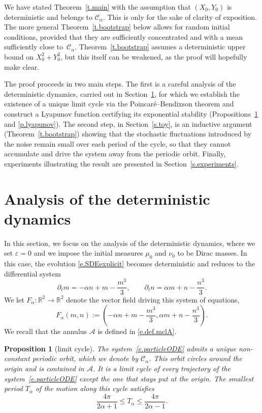\documentclass[11pt]{amsart}
\newtheorem{proposition}{Proposition}
\theoremstyle{remark}
\newtheorem{remark}[proposition]{Remark}
\theoremstyle{definition}
\numberwithin{equation}{section}
\numberwithin{proposition}{section}
\newcommand{\R}{\mathbb{R}}
\newcommand{\ep}{\varepsilon}
\renewcommand{\le}{\leqslant}
\newcommand{\Ll}{\left}
\newcommand{\Rr}{\right}
\newcommand{\dr}{\partial}
\newcommand{\1}{\mathbf{1}}
\newcommand{\mcl}{\mathcal}
\newcommand{\msc}{\mathscr}
\newcommand{\al}{\alpha}
\begin{document}
%
We have stated Theorem~\ref{t.main} with the assumption that $(X_0,Y_0)$ is deterministic and belongs to $\msc C_\al$. This is only for the sake of clarity of exposition. The more general Theorem~\ref{t.bootstrap} below allows for random initial conditions, provided that they are sufficiently concentrated and with a mean sufficiently close to~$\msc C_\al$. Theorem~\ref{t.bootstrap} assumes a deterministic upper bound on $X_0^2 + Y_0^2$, but this itself can be weakened, as the proof will hopefully make clear.
%

The proof proceeds in two main steps. The first is a careful analysis of the deterministic dynamics, carried out in Section~\ref{s.limitcycle}, for which we establish the existence of a unique limit cycle via the Poincaré–Bendixson theorem and construct a Lyapunov function certifying its exponential stability (Propositions~\ref{p.limitcycle} and \ref{p.lyapunov}). The second step, in Section~\ref{s.toy}, is an inductive argument (Theorem~\ref{t.bootstrap}) showing that the stochastic fluctuations introduced by the noise remain small over each period of the cycle, so that they cannot accumulate and drive the system away from the periodic orbit. Finally, experiments illustrating the result are presented in Section~\ref{s.experiments}.

\section{Analysis of the deterministic dynamics}
\label{s.limitcycle}

In this section, we focus on the analysis of the deterministic dynamics, where we set $\ep = 0$ and we impose the initial measures $\mu_0$ and $\nu_0$ to be Dirac masses. In this case, the evolution \eqref{e.SDEexplicit} becomes deterministic and reduces to the differential system
\begin{equation}
\label{e.particleODE}
\dr_t m = -\al n + m - \frac{m^3}{3}, \qquad \dr_t n = \al m + n - \frac{n^3}{3}.
\end{equation}
We let $F_\al : \R^2 \to \R^2$ denote the vector field driving this system of equations, 
\begin{equation}  
\label{e.def.F}
F_\al (m,n) := \Ll(-\al n+m-\frac{m^3}{3}, \al m + n - \frac{n^3}{3}\Rr).
\end{equation}
We recall that the annulus $\mcl A$ is defined in \eqref{e.def.mclA}.
\begin{proposition}[limit cycle]
\label{p.limitcycle}
The system~\eqref{e.particleODE} admits a unique non-constant periodic orbit, which we denote by $\msc C_\al$. This orbit circles around the origin and is contained in $\mcl A$. It is a limit cycle of every trajectory of the system~\eqref{e.particleODE} except the one that stays put at the origin. The smallest period $T_\al$ of the motion along this cycle satisfies 
\begin{equation}  
\label{e.limitcycle.period}
\frac{4\pi}{2\al + 1} \le T_\al \le \frac{4\pi}{2\al - 1}.
\end{equation}
\end{proposition}
\end{document}
